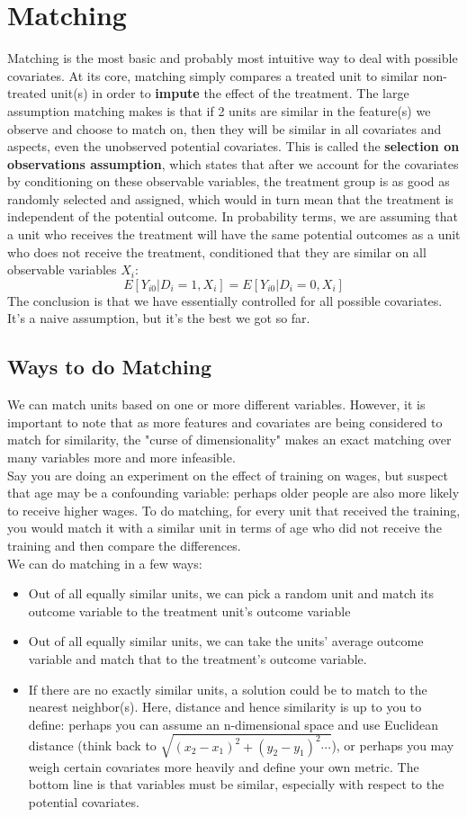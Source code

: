 \documentclass{article}
\begin{document}
\section{Matching}
Matching is the most basic and probably most intuitive way to deal with possible covariates.
At its core, matching simply compares a treated unit to similar non-treated unit(s) in order to \textbf{impute} the effect of the treatment.
The large assumption matching makes is that if 2 units are similar in the feature(s) we observe and choose to match on, then they will be similar in all covariates and aspects, even the unobserved potential covariates.
This is called the \textbf{selection on observations assumption}, which states that after we account for the covariates by conditioning on these observable variables, the treatment group is as good as randomly selected and assigned, which would in turn mean that the treatment is independent of the potential outcome.
In probability terms, we are assuming that a unit who receives the treatment will have the same potential outcomes as a unit who does not receive the treatment, conditioned that they are similar on all observable variables $X_i$:
$$E[Y_{i0} | D_i = 1, X_i] = E[Y_{i0} | D_i = 0, X_i]$$
The conclusion is that we have essentially controlled for all possible covariates. 
It's a naive assumption, but it's the best we got so far. 

\subsection{Ways to do Matching}
We can match units based on one or more different variables.
However, it is important to note that as more features and covariates are being considered to match for similarity, the "curse of dimensionality" makes an exact matching over many variables more and more infeasible.
\\
Say you are doing an experiment on the effect of training on wages, but suspect that age may be a confounding variable: perhaps older people are also more likely to receive higher wages. 
To do matching, for every unit that received the training, you would match it with a similar unit in terms of age who did not receive the training and then compare the differences. 
\\
We can do matching in a few ways:
\begin{itemize}
	\item Out of all equally similar units, we can pick a random unit and match its outcome variable to the treatment unit's outcome variable
	\item Out of all equally similar units, we can take the units' average outcome variable and match that to the treatment's outcome variable.
	\item If there are no exactly similar units, a solution could be to match to the nearest neighbor(s).
	Here, distance and hence similarity is up to you to define: perhaps you can assume an n-dimensional space and use Euclidean distance (think back to $\sqrt{(x_2-x_1)^2 + (y_2-y_1)^2 \cdots}$), or perhaps you may weigh certain covariates more heavily and define your own metric. 
	The bottom line is that variables must be similar, especially with respect to the potential covariates.
\end{itemize}
\end{document}

